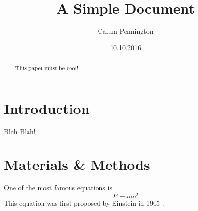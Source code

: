 \documentclass[12pt]{article}
\title{A Simple Document}
\author{Calum Pennington}
\date{10.10.2016}
\begin{document}
	\maketitle
	
	\begin{abstract}
		This paper must be cool!
	\end{abstract}
	
	\section{Introduction}
		Blah Blah!
		
	\section{Materials \& Methods}
	One of the most famous equations is:
	\begin{equation}
		E = mc^2
	\end{equation}
	This equation was first proposed by Einstein in 1905
	\cite{einstein1905does}.

	
	
\end{document}
